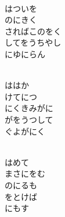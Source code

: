 \documentclass[10pt,b5j]{tarticle} %
\begin{document}
\begin{enumerate}
\begin{minipage}[c]{\blocksize}
    \end{minipage}
    \begin{minipage}[c]{\blocksize}
        
        \vspace{\linespace}
        \item~\\
        はついを\\
        のにきく\\
        さればこのをく\\
        してをうちやし\\
        にゆにらん
        
    \end{minipage}
    \begin{minipage}[c]{\blocksize}
        
        \vspace{\linespace}
        \item~\\
        ははか\\
        けてにつ\\
        にくきみがに\\
        がをうつして\\
        ぐよがにく
        
    \end{minipage}
    \begin{minipage}[c]{\blocksize}
        
        \vspace{\linespace}
        \item~\\
        はめて\\
        まさにをむ\\
        のにるも\\
        をとけば\\
        にもす
        

\end{minipage}
\end{enumerate}
\end{document}
